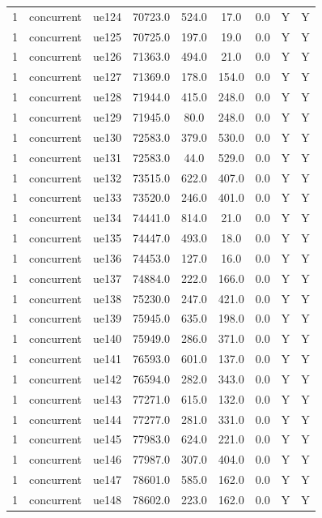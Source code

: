 \begin{table}[ht]
\begin{tabular}{|c|c|c|c|c|c|c|c|c|}
1 & concurrent & ue124 & 70723.0 & 524.0 & 17.0 & 0.0 & Y & Y \\
1 & concurrent & ue125 & 70725.0 & 197.0 & 19.0 & 0.0 & Y & Y \\
1 & concurrent & ue126 & 71363.0 & 494.0 & 21.0 & 0.0 & Y & Y \\
1 & concurrent & ue127 & 71369.0 & 178.0 & 154.0 & 0.0 & Y & Y \\
1 & concurrent & ue128 & 71944.0 & 415.0 & 248.0 & 0.0 & Y & Y \\
1 & concurrent & ue129 & 71945.0 & 80.0 & 248.0 & 0.0 & Y & Y \\
1 & concurrent & ue130 & 72583.0 & 379.0 & 530.0 & 0.0 & Y & Y \\
1 & concurrent & ue131 & 72583.0 & 44.0 & 529.0 & 0.0 & Y & Y \\
1 & concurrent & ue132 & 73515.0 & 622.0 & 407.0 & 0.0 & Y & Y \\
1 & concurrent & ue133 & 73520.0 & 246.0 & 401.0 & 0.0 & Y & Y \\
1 & concurrent & ue134 & 74441.0 & 814.0 & 21.0 & 0.0 & Y & Y \\
1 & concurrent & ue135 & 74447.0 & 493.0 & 18.0 & 0.0 & Y & Y \\
1 & concurrent & ue136 & 74453.0 & 127.0 & 16.0 & 0.0 & Y & Y \\
1 & concurrent & ue137 & 74884.0 & 222.0 & 166.0 & 0.0 & Y & Y \\
1 & concurrent & ue138 & 75230.0 & 247.0 & 421.0 & 0.0 & Y & Y \\
1 & concurrent & ue139 & 75945.0 & 635.0 & 198.0 & 0.0 & Y & Y \\
1 & concurrent & ue140 & 75949.0 & 286.0 & 371.0 & 0.0 & Y & Y \\
1 & concurrent & ue141 & 76593.0 & 601.0 & 137.0 & 0.0 & Y & Y \\
1 & concurrent & ue142 & 76594.0 & 282.0 & 343.0 & 0.0 & Y & Y \\
1 & concurrent & ue143 & 77271.0 & 615.0 & 132.0 & 0.0 & Y & Y \\
1 & concurrent & ue144 & 77277.0 & 281.0 & 331.0 & 0.0 & Y & Y \\
1 & concurrent & ue145 & 77983.0 & 624.0 & 221.0 & 0.0 & Y & Y \\
1 & concurrent & ue146 & 77987.0 & 307.0 & 404.0 & 0.0 & Y & Y \\
1 & concurrent & ue147 & 78601.0 & 585.0 & 162.0 & 0.0 & Y & Y \\
1 & concurrent & ue148 & 78602.0 & 223.0 & 162.0 & 0.0 & Y & Y \\

\end{tabular}
\end{table}
